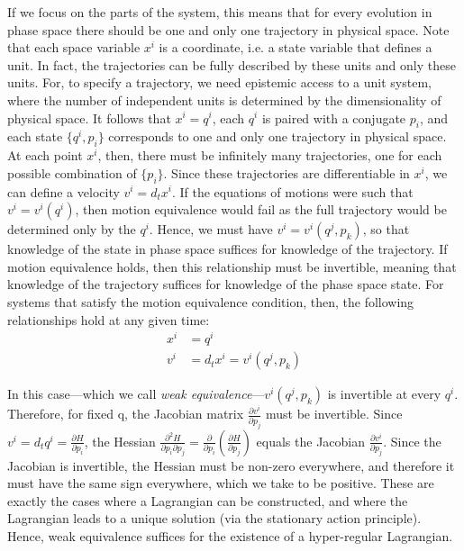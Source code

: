 \documentclass[letterpaper]{article}
\begin{document}
If we focus on the parts of the system, this means that for every evolution in phase space there should be one and only one trajectory in physical space. Note that each space variable $x^i$ is a coordinate, i.e. a state variable that defines a unit. In fact, the trajectories can be fully described by these units and only these units. For, to specify a trajectory, we need epistemic access to a unit system, where the number of independent units is determined by the dimensionality of physical space. It follows that $x^i = q^i$, each $q^i$ is paired with a conjugate $p_i$, and each state $\{q^i, p_i\}$ corresponds to one and only one trajectory in physical space. At each point $x^i$, then, there must be infinitely many trajectories, one for each possible combination of $\{p_i\}$. Since these trajectories are differentiable in $x^i$, we can define a velocity $v^i = d_t x^i$. If the equations of motions were such that $v^i=v^i(q^i)$, then motion equivalence would fail as the full trajectory would be determined only by the $q^i$. Hence, we must have $v^i=v^i(q^j, p_k)$, so that knowledge of the state in phase space suffices for knowledge of the trajectory. If motion equivalence holds, then this relationship must be invertible, meaning that knowledge of the trajectory suffices for knowledge of the phase space state. For systems that satisfy the motion equivalence condition, then, the following relationships hold at any given time:
\begin{equation}
\begin{aligned}
x^i &= q^i \\
v^i &= d_t x^i = v^i(q^j, p_k)
\end{aligned}
\end{equation}

In this case---which we call \textit{weak equivalence}---$v^i(q^j, p_k)$ is invertible at every $q^i$. Therefore, for fixed q, the Jacobian matrix  $\frac{\partial v^i}{\partial p_j}$ must be invertible. Since $v^i = d_t q^i = \frac{\partial H}{\partial p_i}$, the Hessian $\frac{\partial^2 H}{\partial p_i \partial p_j} = \frac{\partial}{\partial p_i} (\frac{\partial H}{\partial p_j})$ equals the Jacobian $\frac{\partial v^i}{\partial p_j}$. Since the Jacobian is invertible, the Hessian must be non-zero everywhere, and therefore it must have the same sign everywhere, which we take to be positive. These are exactly the cases where a Lagrangian can be constructed, and where the Lagrangian leads to a unique solution (via the stationary action principle). Hence, weak equivalence suffices for the existence of a hyper-regular Lagrangian.
\end{document}
